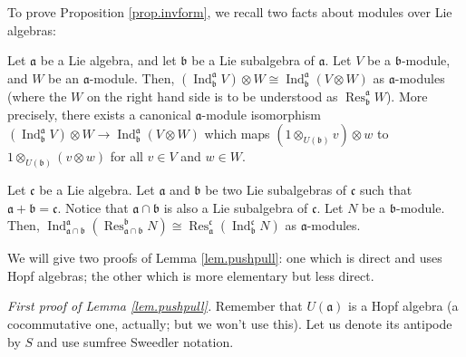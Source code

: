 \documentclass[etingof-lie.tex]{subfiles}
\begin{document}
To prove Proposition \ref{prop.invform}, we recall two facts about modules
over Lie algebras:

\begin{lemma}
\label{lem.pushpull}Let $\mathfrak{a}$ be a Lie algebra, and let
$\mathfrak{b}$ be a Lie subalgebra of $\mathfrak{a}$. Let $V$ be a
$\mathfrak{b}$-module, and $W$ be an $\mathfrak{a}$-module. Then, $\left(
\operatorname*{Ind}\nolimits_{\mathfrak{b}}^{\mathfrak{a}}V\right)  \otimes
W\cong\operatorname*{Ind}\nolimits_{\mathfrak{b}}^{\mathfrak{a}}\left(
V\otimes W\right)  $ as $\mathfrak{a}$-modules (where the $W$ on the right
hand side is to be understood as $\operatorname*{Res}\nolimits_{\mathfrak{b}%
}^{\mathfrak{a}}W$). More precisely, there exists a canonical $\mathfrak{a}%
$-module isomorphism $\left(  \operatorname*{Ind}\nolimits_{\mathfrak{b}%
}^{\mathfrak{a}}V\right)  \otimes W\rightarrow\operatorname*{Ind}%
\nolimits_{\mathfrak{b}}^{\mathfrak{a}}\left(  V\otimes W\right)  $ which maps
$\left(  1\otimes_{U\left(  \mathfrak{b}\right)  }v\right)  \otimes w$ to
$1\otimes_{U\left(  \mathfrak{b}\right)  }\left(  v\otimes w\right)  $ for all
$v\in V$ and $w\in W$.
\end{lemma}

\begin{lemma}
\label{lem.IndRes}Let $\mathfrak{c}$ be a Lie algebra. Let $\mathfrak{a}$ and
$\mathfrak{b}$ be two Lie subalgebras of $\mathfrak{c}$ such that
$\mathfrak{a}+\mathfrak{b}=\mathfrak{c}$. Notice that $\mathfrak{a}%
\cap\mathfrak{b}$ is also a Lie subalgebra of $\mathfrak{c}$. Let $N$ be a
$\mathfrak{b}$-module. Then, $\operatorname*{Ind}\nolimits_{\mathfrak{a}%
\cap\mathfrak{b}}^{\mathfrak{a}}\left(  \operatorname*{Res}%
\nolimits_{\mathfrak{a}\cap\mathfrak{b}}^{\mathfrak{b}}N\right)
\cong\operatorname*{Res}\nolimits_{\mathfrak{a}}^{\mathfrak{c}}\left(
\operatorname*{Ind}\nolimits_{\mathfrak{b}}^{\mathfrak{c}}N\right)  $ as
$\mathfrak{a}$-modules.
\end{lemma}

We will give two proofs of Lemma \ref{lem.pushpull}: one which is direct and
uses Hopf algebras; the other which is more elementary but less direct.

\textit{First proof of Lemma \ref{lem.pushpull}.} Remember that $U\left(
\mathfrak{a}\right)  $ is a Hopf algebra (a cocommutative one, actually; but
we won't use this). Let us denote its antipode by $S$ and use sumfree Sweedler notation.
\end{document}
